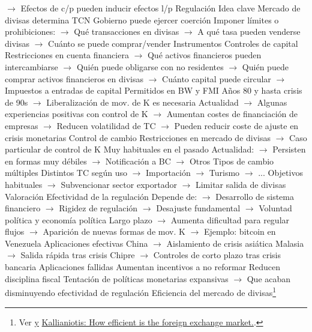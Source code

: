 \documentclass{nuevotema}
\begin{document}
\begin{esquemal}
				\4[] $\to$ Efectos de c/p pueden inducir efectos l/p
		\2 Regulación
			\3 Idea clave
				\4 Mercado de divisas determina TCN
				\4 Gobierno puede ejercer coerción
				\4[] Imponer límites o prohibiciones:
				\4[] $\to$ Qué transacciones en divisas
				\4[] $\to$ A qué tasa pueden venderse divisas
				\4[] $\to$ Cuánto se puede comprar/vender
			\3 Instrumentos
				\4 Controles de capital
				\4[] Restricciones en cuenta financiera
				\4[] $\to$ Qué activos financieros pueden intercambiarse
				\4[] $\to$ Quién puede obligarse con no residentes
				\4[] $\to$ Quién puede comprar activos financieros en divisas
				\4[] $\to$ Cuánto capital puede circular
				\4[] $\to$ Impuestos a entradas de capital
				\4[] Permitidos en BW y FMI
				\4[] Años 80 y hasta crisis de 90s
				\4[] $\to$ Liberalización de mov. de K es necesaria
				\4[] Actualidad
				\4[] $\to$ Algunas experiencias positivas con control de K
				\4[] $\to$ Aumentan costes de financiación de empresas
				\4[] $\to$ Reducen volatilidad de TC
				\4[] $\to$ Pueden reducir coste de ajuste en crisis monetarias
				\4 Control de cambio
				\4[] Restricciones en mercado de divisas
				\4[] $\to$ Caso particular de control de K
				\4[] Muy habituales en el pasado
				\4[] Actualidad:
				\4[] $\to$ Persisten en formas muy débiles
				\4[] $\to$ Notificación a BC
				\4[] $\to$ Otros
				\4 Tipos de cambio múltiples
				\4[] Distintos TC según uso
				\4[] $\to$ Importación
				\4[] $\to$ Turismo
				\4[] $\to$ ...
				\4[] Objetivos habituales
				\4[] $\to$ Subvencionar sector exportador
				\4[] $\to$ Limitar salida de divisas
			\3 Valoración
				\4 Efectividad de la regulación
				\4[] Depende de:
				\4[] $\to$ Desarrollo de sistema financiero
				\4[] $\to$ Rigidez de regulación
				\4[] $\to$ Desajuste fundamental
				\4[] $\to$ Voluntad política y economía política
				\4[] Largo plazo
				\4[] $\to$ Aumenta dificultad para regular flujos
				\4[] $\to$ Aparición de nuevas formas de mov. K
				\4[] $\to$ Ejemplo: bitcoin en Venezuela
				\4 Aplicaciones efectivas
				\4[] China
				\4[] $\to$ Aislamiento de crisis asiática
				\4[] Malasia
				\4[] $\to$ Salida rápida tras crisis
				\4[] Chipre
				\4[] $\to$ Controles de corto plazo tras crisis bancaria
				\4 Aplicaciones fallidas
				\4[] Aumentan incentivos a no reformar
				\4[] Reducen disciplina fiscal
				\4[] Tentación de políticas monetarias expansivas
				\4[] $\to$ Que acaban disminuyendo efectividad de regulación
	\1 
		\2 Eficiencia del mercado de divisas\footnote{Ver \href{https://web.stanford.edu/class/msande247s/2008/fourth\%20week\%20posting/2008chap07a\%200716\%202008.pdf} y \href{https://www.athensjournals.gr/business/2018-1-X-Y-Kallianiotis.pdf}{Kallianiotis: How efficient is the foreign exchange market.}.}

\end{esquemal}
\end{document}
